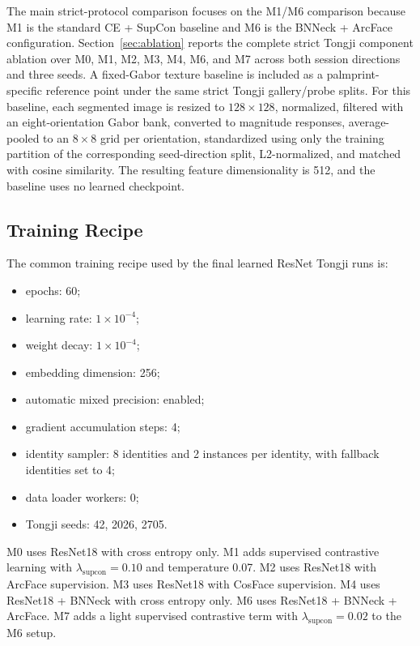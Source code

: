 The main strict-protocol comparison focuses on the M1/M6 comparison because M1 is the standard CE + SupCon baseline and M6 is the BNNeck + ArcFace configuration. Section~\ref{sec:ablation} reports the complete strict Tongji component ablation over M0, M1, M2, M3, M4, M6, and M7 across both session directions and three seeds. A fixed-Gabor texture baseline is included as a palmprint-specific reference point under the same strict Tongji gallery/probe splits. For this baseline, each segmented image is resized to $128\times128$, normalized, filtered with an eight-orientation Gabor bank, converted to magnitude responses, average-pooled to an $8\times8$ grid per orientation, standardized using only the training partition of the corresponding seed-direction split, L2-normalized, and matched with cosine similarity. The resulting feature dimensionality is 512, and the baseline uses no learned checkpoint.

\subsection{Training Recipe}

The common training recipe used by the final learned ResNet Tongji runs is:
\begin{itemize}
    \item epochs: 60;
    \item learning rate: $1 \times 10^{-4}$;
    \item weight decay: $1 \times 10^{-4}$;
    \item embedding dimension: 256;
    \item automatic mixed precision: enabled;
    \item gradient accumulation steps: 4;
    \item identity sampler: 8 identities and 2 instances per identity, with fallback identities set to 4;
    \item data loader workers: 0;
    \item Tongji seeds: 42, 2026, 2705.
\end{itemize}

M0 uses ResNet18 with cross entropy only. M1 adds supervised contrastive learning with $\lambda_{\mathrm{supcon}}=0.10$ and temperature 0.07. M2 uses ResNet18 with ArcFace supervision. M3 uses ResNet18 with CosFace supervision. M4 uses ResNet18 + BNNeck with cross entropy only. M6 uses ResNet18 + BNNeck + ArcFace. M7 adds a light supervised contrastive term with $\lambda_{\mathrm{supcon}}=0.02$ to the M6 setup.

